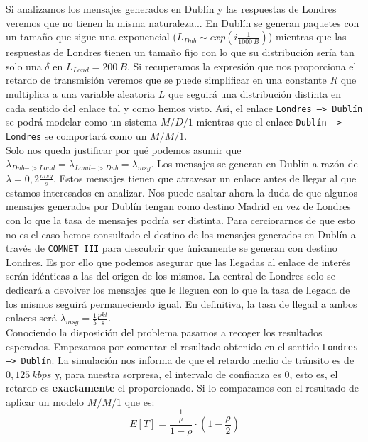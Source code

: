 \documentclass{report}[10 pt]
\begin{document}
		Si analizamos los mensajes generados en Dublín y las respuestas de Londres veremos que no tienen la misma naturaleza... En Dublín se generan paquetes con un tamaño que sigue una exponencial ($L_{Dub} \sim exp(i\frac{1}{1000\ B})$) mientras que las respuestas de Londres tienen un tamaño fijo con lo que su distribución sería tan solo una $\delta$ en $L_{Lond} = 200\ B$. Si recuperamos la expresión que nos proporciona el retardo de transmisión veremos que se puede simplificar en una constante $R$ que multiplica a una variable aleatoria $L$ que seguirá una distribución distinta en cada sentido del enlace tal y como hemos visto. Así, el enlace \texttt{Londres --> Dublín} se podrá modelar como un sistema $M/D/1$ mientras que el enlace \texttt{Dublín --> Londres} se comportará como un $M/M/1$.
		\\

		Solo nos queda justificar por qué podemos asumir que $\lambda_{Dub -> Lond} = \lambda_{Lond -> Dub} = \lambda_{msg}$. Los mensajes se generan en Dublín a razón de $\lambda = 0,2 \frac{msg}{s}$. Estos mensajes tienen que atravesar un enlace antes de llegar al que estamos interesados en analizar. Nos puede asaltar ahora la duda de que algunos mensajes generados por Dublín tengan como destino Madrid en vez de Londres con lo que la tasa de mensajes podría ser distinta. Para cerciorarnos de que esto no es el caso hemos consultado el destino de los mensajes generados en Dublín a través de \texttt{COMNET III} para descubrir que únicamente se generan con destino Londres. Es por ello que podemos asegurar que las llegadas al enlace de interés serán idénticas a las del origen de los mismos. La central de Londres solo se dedicará a devolver los mensajes que le lleguen con lo que la tasa de llegada de los mismos seguirá permaneciendo igual. En definitiva, la tasa de llegad a ambos enlaces será $\lambda_{msg} = \frac{1}{5} \frac{pkt}{s}$.
		\\

		Conociendo la disposición del problema pasamos a recoger los resultados esperados. Empezamos por comentar el resultado obtenido en el sentido \texttt{Londres --> Dublín}. La simulación nos informa de que el retardo medio de tránsito es de $0,125\ kbps$ y, para nuestra sorpresa, el intervalo de confianza es $0$, esto es, el retardo es \textbf{exactamente} el proporcionado. Si lo comparamos con el resultado de aplicar un modelo $M/M/1$ que es:
		$$E[T] = \frac{\frac{1}{\mu}}{1 - \rho} \cdot (1 - \frac{\rho}{2})$$
\end{document}
